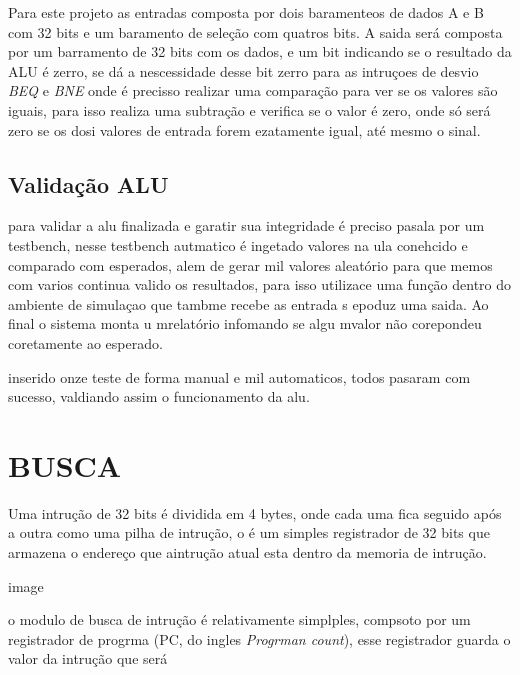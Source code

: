 Para este projeto as entradas composta por dois baramenteos de dados  A e B com 32 bits e um baramento de seleção com quatros bits. A saida será composta por um barramento de 32 bits com os dados, e um bit indicando se o resultado da ALU é zerro, se dá a nescessidade desse bit zerro para as intruçoes de desvio \textit{BEQ} e \textit{BNE} onde é precisso realizar uma comparação para ver se os valores são iguais, para isso realiza uma subtração e verifica se o valor é zero, onde só será zero se os dosi valores de entrada forem ezatamente igual, até mesmo o sinal. 

\subsection{Validação ALU}
\label{sub:tb_alu}

para validar a alu finalizada e garatir sua integridade é preciso pasala por um testbench, nesse testbench autmatico é ingetado valores na ula conehcido e comparado com esperados, alem de gerar mil valores aleatório para que memos com varios continua valido os resultados, para isso utilizace uma função dentro do ambiente de simulaçao que tambme recebe as entrada s epoduz uma saida. Ao final o sistema monta u mrelatório infomando se algu mvalor não corepondeu coretamente ao esperado.

inserido onze teste de forma manual  e mil automaticos, todos pasaram com sucesso, valdiando assim o funcionamento da alu.



\section{BUSCA}
\label{sec:busca}

Uma intrução de 32 bits é dividida em 4 bytes, onde cada uma fica seguido após a outra como uma pilha de intrução, o é um simples registrador de 32 bits que armazena o endereço que aintrução atual esta dentro da memoria de intrução.

image

o modulo de busca de intrução é relativamente simplples, compsoto por um registrador de progrma (PC, do ingles \textit{Progrman count}), esse registrador guarda o valor da intrução que será 

